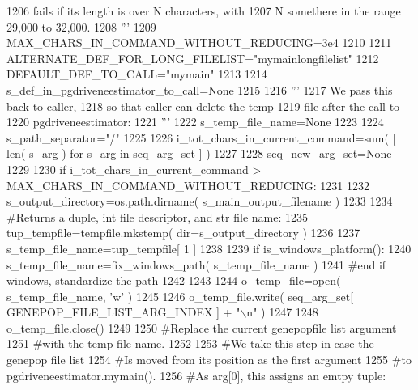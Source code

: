 \begin{DoxyCode}
1206 \textcolor{stringliteral}{    fails if its length is over N characters, with }
1207 \textcolor{stringliteral}{    N somethere in the range 29,000 to 32,000.}
1208 \textcolor{stringliteral}{    '''}
1209     MAX\_CHARS\_IN\_COMMAND\_WITHOUT\_REDUCING=3e4
1210 
1211     ALTERNATE\_DEF\_FOR\_LONG\_FILELIST=\textcolor{stringliteral}{"mymainlongfilelist"}
1212     DEFAULT\_DEF\_TO\_CALL=\textcolor{stringliteral}{"mymain"}
1213 
1214     s\_def\_in\_pgdriveneestimator\_to\_call=\textcolor{keywordtype}{None}
1215 
1216     \textcolor{stringliteral}{'''}
1217 \textcolor{stringliteral}{    We pass this back to caller,}
1218 \textcolor{stringliteral}{    so that caller can delete the temp}
1219 \textcolor{stringliteral}{    file after the call to }
1220 \textcolor{stringliteral}{    pgdriveneestimator:}
1221 \textcolor{stringliteral}{    '''}
1222     s\_temp\_file\_name=\textcolor{keywordtype}{None}
1223 
1224     s\_path\_separator=\textcolor{stringliteral}{"/"}
1225 
1226     i\_tot\_chars\_in\_current\_command=sum( [ len( s\_arg ) \textcolor{keywordflow}{for} s\_arg \textcolor{keywordflow}{in} seq\_arg\_set ] )
1227 
1228     seq\_new\_arg\_set=\textcolor{keywordtype}{None}
1229 
1230     \textcolor{keywordflow}{if} i\_tot\_chars\_in\_current\_command > MAX\_CHARS\_IN\_COMMAND\_WITHOUT\_REDUCING:
1231 
1232         s\_output\_directory=os.path.dirname( s\_main\_output\_filename )
1233 
1234         \textcolor{comment}{#Returns a duple, int file descriptor, and str file name:}
1235         tup\_tempfile=tempfile.mkstemp( dir=s\_output\_directory )
1236 
1237         s\_temp\_file\_name=tup\_tempfile[ 1 ]
1238 
1239         \textcolor{keywordflow}{if} is\_windows\_platform():
1240             s\_temp\_file\_name=fix\_windows\_path( s\_temp\_file\_name )
1241         \textcolor{comment}{#end if windows, standardize the path}
1242 
1243 
1244         o\_temp\_file=open( s\_temp\_file\_name, \textcolor{stringliteral}{'w'} )
1245 
1246         o\_temp\_file.write( seq\_arg\_set[ GENEPOP\_FILE\_LIST\_ARG\_INDEX ] + \textcolor{stringliteral}{"\(\backslash\)n"} )
1247 
1248         o\_temp\_file.close()
1249         
1250         \textcolor{comment}{#Replace the current genepopfile list argument}
1251         \textcolor{comment}{#with the temp file name.}
1252 
1253         \textcolor{comment}{#We take this step in case the genepop file list}
1254         \textcolor{comment}{#Is moved from its position as the first argument}
1255         \textcolor{comment}{#to pgdriveneestimator.mymain().}
1256         \textcolor{comment}{#As arg[0], this assigns an emtpy tuple:}

\end{DoxyCode}
